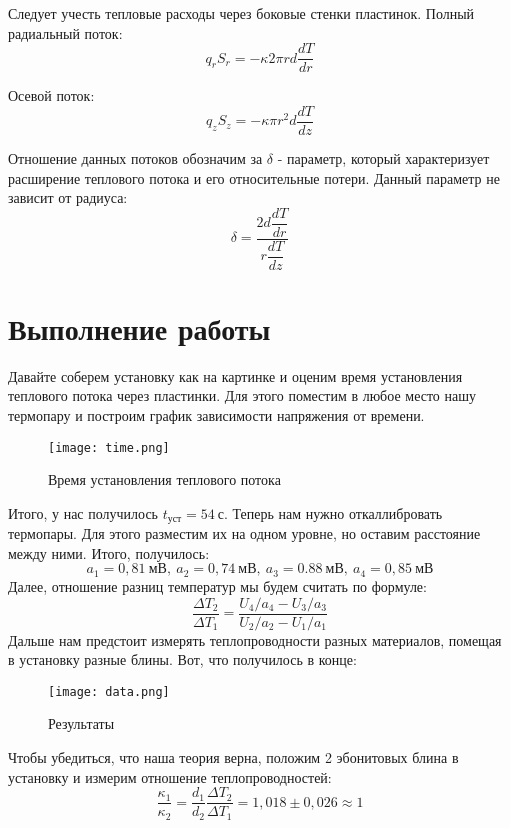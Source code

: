 \documentclass[a4paper, 12pt]{article}
\begin{document}
    Следует учесть тепловые расходы через боковые стенки пластинок. Полный радиальный поток:
    \begin{equation}
        q_r S_r = - \kappa 2\pi r d \dfrac{dT}{dr}        
    \end{equation}

    Осевой поток:
    \begin{equation}
        q_z S_z = - \kappa \pi r^2 d \dfrac{dT}{dz}        
    \end{equation}

    Отношение данных потоков обозначим за $\delta$ - параметр, который характеризует расширение теплового потока и его относительные потери. Данный параметр не зависит от радиуса:
    \begin{equation}
        \delta = \dfrac{2d \dfrac{dT}{dr}}{r \dfrac{dT}{dz}}        
    \end{equation}
    
\section {Выполнение работы} 
Давайте соберем установку как на картинке и оценим время установления теплового потока через пластинки. Для этого поместим в любое место нашу термопару и построим график зависимости напряжения от времени.

\begin{figure}[H]
        \centering
        \texttt{[image: time.png]}
        \caption{Время установления теплового потока}
    \end{figure}

Итого, у нас получилось \(t_{уст} = 54 \ с\). Теперь нам нужно откаллибровать термопары. Для этого разместим их на одном уровне, но оставим расстояние между ними.
Итого, получилось:
\[a_1 = 0,81 \ мВ, \  a_2 = 0,74\ мВ,\ a_3 = 0.88\ мВ,\ a_4 = 0,85\ мВ\]
Далее, отношение разниц температур мы будем считать по формуле:
\[\frac{\Delta T_2}{\Delta T_1} = \frac{U_4/a_4 - U_3/a_3}{U_2/a_2 - U_1/a_1}\]
Дальше нам предстоит измерять теплопроводности разных материалов, помещая в установку разные блины. Вот, что получилось в конце:
\begin{figure}[H]
    \centering
    \texttt{[image: data.png]}
    \caption{Результаты}
\end{figure}

Чтобы убедиться, что наша теория верна, положим 2 эбонитовых блина в установку и измерим отношение теплопроводностей:
\[\dfrac{\kappa_1}{\kappa_2} = \dfrac{d_1}{d_2} \dfrac{\Delta T_2}{\Delta T_1} = 1,018 \pm 0,026 \approx 1\]
\end{document}
